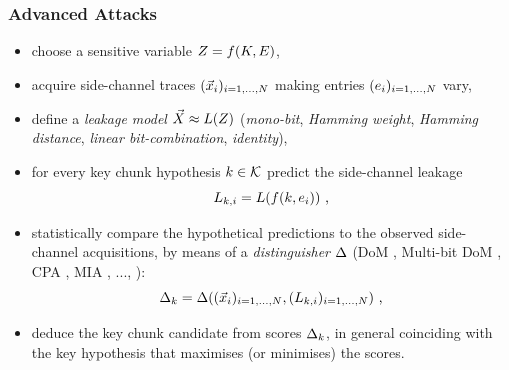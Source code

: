 \begin{frame}
\frametitle{Advanced Attacks}
\begin{itemize}
\item choose a sensitive variable $Z = f(K,E)$, 
\item acquire side-channel traces $(\vec{x}_i)_{i=1,\dots , N}$ making entries $(e_i)_{i=1,\dots,N}$ vary,
\item define a \emph{leakage model} $\vec{X} \approx L(Z)$ (\eg \emph{mono-bit}, \emph{Hamming weight}, \emph{Hamming distance}, \emph{linear bit-combination}, \emph{identity}),
\item for every key chunk hypothesis $k \in \mathcal{K}$ predict the side-channel leakage 
\begin{equation}\label{eq:predictions}
L_{k,i} = L(f(k,e_i)) \mbox{ ,}
\end{equation}
\item statistically compare the hypothetical predictions to the observed side-channel acquisitions, by means of a  \emph{distinguisher} $\Delta$ (\eg DoM \cite{kocher1999differential}, Multi-bit DoM \cite{bevan2002ways,messerges2002examining}, CPA \cite{brier2004correlation}, MIA \cite{gierlichs2008mutual,batina2011mutual}, ..., ):
\begin{equation}
\Delta_{k} = \Delta((\vec{x}_i)_{i=1,\dots , N}, (L_{k,i} )_{i=1,\dots , N}) \mbox{ ,}
\end{equation}
\item deduce the key chunk candidate from scores $\Delta_{k}$, in general coinciding with the key hypothesis that maximises (or minimises) the scores.
\end{itemize}

\end{frame}



